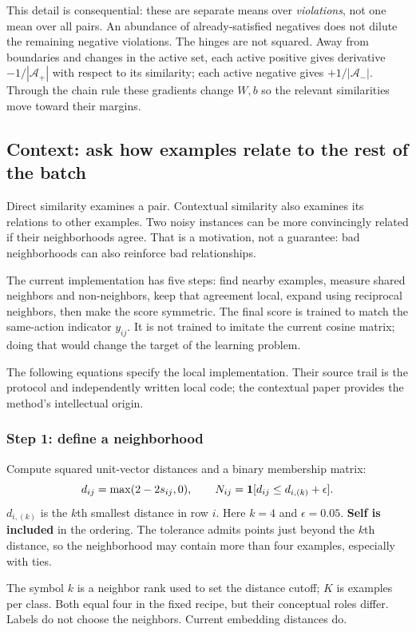 This detail is consequential: these are separate means over \emph{violations},
not one mean over all pairs. An abundance of already-satisfied negatives does
not dilute the remaining negative violations. The hinges are not squared.
Away from boundaries and changes in the active set, each active positive gives
derivative $-1/|\mathcal A_+|$ with respect to its similarity; each active
negative gives $+1/|\mathcal A_-|$. Through the chain rule these gradients change
$W,b$ so the relevant similarities move toward their margins.

\subsection{Context: ask how examples relate to the rest of the batch}
Direct similarity examines a pair. Contextual similarity also examines its
relations to other examples. Two noisy instances can be more convincingly
related if their neighborhoods agree. That is a motivation, not a guarantee:
bad neighborhoods can also reinforce bad relationships.

The current implementation has five steps: find nearby examples, measure shared
neighbors and non-neighbors, keep that agreement local, expand using reciprocal
neighbors, then make the score symmetric. The final score is trained to match
the same-action indicator $y_{ij}$. It is not trained to imitate the current
cosine matrix; doing that would change the target of the learning problem.

The following equations specify the local implementation. Their source trail
is the protocol and independently written local code; the contextual paper
provides the method's intellectual origin.\cite{contextual}

\subsubsection*{Step 1: define a neighborhood}
Compute squared unit-vector distances and a binary membership matrix:
\[
 d_{ij}=\max(2-2s_{ij},0),\qquad
 N_{ij}=\mathbf{1}[d_{ij}\le d_{i,(k)}+\epsilon].
\]
$d_{i,(k)}$ is the $k$th smallest distance in row $i$. Here $k=4$ and
$\epsilon=0.05$. \textbf{Self is included} in the ordering. The tolerance
admits points just beyond the $k$th distance, so the neighborhood may contain
more than four examples, especially with ties.

The symbol $k$ is a neighbor rank used to set the distance cutoff; $K$ is
examples per class. Both equal
four in the fixed recipe, but their conceptual roles differ. Labels do not
choose the neighbors. Current embedding distances do.

